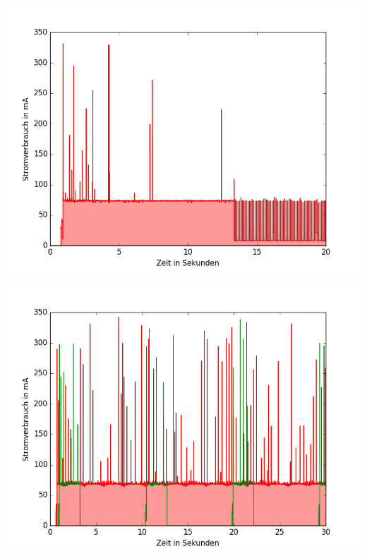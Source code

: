 \documentclass[18pt]{beamer}
\begin{document}
\begin{frame}
	\begin{minipage}[c][\textheight][c]{\textwidth}
		\centering
		\includegraphics[height=0.95\textheight]{plots/tcphold.png}
	\end{minipage}
\end{frame}

\begin{frame}
	\begin{minipage}[c][\textheight][c]{\textwidth}
		\centering
		\includegraphics[height=0.95\textheight]{plots/noap.png}
	\end{minipage}
\end{frame}
\end{document}
